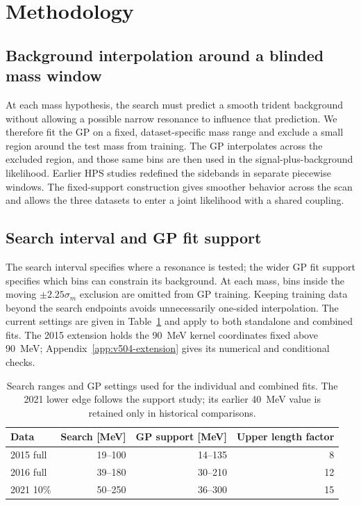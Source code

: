 \section{Methodology}
\label{sec:methodology}

\subsection{Background interpolation around a blinded mass window}

At each mass hypothesis, the search must predict a smooth trident background without
allowing a possible narrow resonance to influence that prediction. We therefore fit the
GP on a fixed, dataset-specific mass range and exclude a small region around the test
mass from training. The GP interpolates across the excluded region, and those same bins
are then used in the signal-plus-background likelihood. Earlier HPS studies redefined
the sidebands in separate piecewise windows. The fixed-support construction gives
smoother behavior across the scan and allows the three datasets to enter a joint
likelihood with a shared coupling.

\subsection{Search interval and GP fit support}
\label{sec:fit-support-policy}

The search interval specifies where a resonance is tested; the wider GP fit
support specifies which bins can constrain its background. At each mass, bins
inside the moving $\pm2.25\sigma_m$ exclusion are omitted from GP training.
Keeping training data beyond the search endpoints avoids unnecessarily
one-sided interpolation. The current settings are given in
Table~\ref{tab:v4p9-card-lineage} and apply to both standalone and combined fits.
The 2015 extension holds the 90~MeV kernel coordinates fixed above 90~MeV;
Appendix~\ref{app:v504-extension} gives its numerical and conditional checks.

\begin{table}[htbp]
\centering
\begin{tabular}{lrrr}
\toprule
Data & Search [MeV] & GP support [MeV] & Upper length factor \\
\midrule
2015 full & 19--100 & 14--135 & 8 \\
2016 full & 39--180 & 30--210 & 12 \\
2021 10\% & 50--250 & 36--300 & 15 \\
\bottomrule
\end{tabular}
\caption{Search ranges and GP settings used for the individual and combined fits.
The 2021 lower edge follows the support study;
its earlier 40~MeV value is retained only in historical comparisons.}
\label{tab:v4p9-card-lineage}
\end{table}

